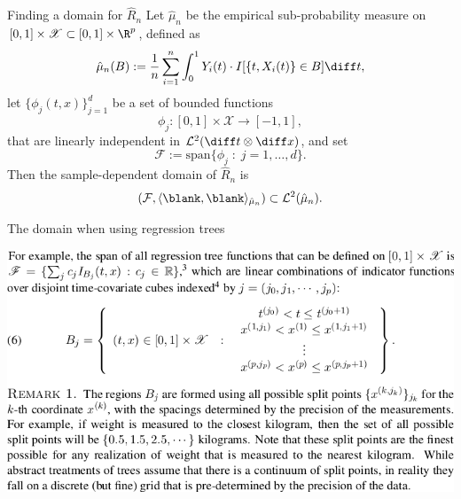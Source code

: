 \documentclass{beamer}\usepackage{listings}
\begin{document}
\begin{frame}[label={sec:org732c07e}]{Finding a domain for \(\hat{R}_n\)}
Let $\hat{\mu}_n$ be the empirical sub-probability measure on $[0,1] \times \mathscr{X} \subset
[0,1] \times \R^p$, defined as
\begin{equation*}
  \hat{\mu}_n(B) := \frac{1}{n}\sum_{i=1}^{n}\int_0^1 Y_i(t) \cdot I[\{t, X_i(t)\} \in B] \diff t,
\end{equation*}
let $\{\phi_j(t,x)\}_{j=1}^d$ be a set of bounded functions
\begin{equation*}
  \phi_j \colon [0,1] \times \mathscr{X}  \rightarrow [-1,1],
\end{equation*}
that are linearly independent in $\mathcal{L}^2(\diff t \otimes \diff x)$, and set
\begin{equation*}
  \mathcal{F} := \mathrm{span}\{\phi_j \; : \; j = 1, \dots, d\}.
\end{equation*}
Then the sample-dependent
domain of $\hat{R}_n$ is
\begin{equation*}
  (\mathcal{F}, \langle\blank, \blank\rangle_{\hat{\mu}_n}) \subset \mathcal{L}^2(\hat{\mu}_n).
\end{equation*}
\end{frame}

\begin{frame}[label={sec:org3e58cce}]{The domain when using regression trees}
\begin{center}
\includegraphics[width=.9\linewidth]{./screenshots/Screenshot_basis-trees.png}
\end{center}
\end{frame}
\end{document}
